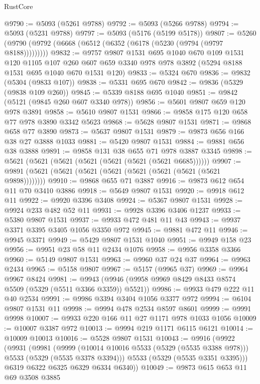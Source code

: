 \begin{lexlean}{RustCore}
\begin{coremodule}
@9790 := @5093 (@5261 @9788)
@9792 := @5093 (@5266 @9788)
@9794 := @5093 (@5231 @9788)
@9797 := @5093 (@5176 (@5199 @5178))
@9807 := @5260 (@9790 (@9792 (@6668 (@6512 (@6352 (@6178 (@5230 (@9794 (@9797 @8188)))))))))
@9832 := @9757
    @9807
    @1531
    @695
    @1040
    @670
    @109
    @1531
    @120
    @1105
    @107
    @260
    @607
    @659
    @3340
    @978
    @978
    @3892
    (@5294 @8188 @1531 @695 @1040 @670 @1531 @120)
@9833 := @5324 @670
@9836 := @9832 (@5304 (@9833 @107))
@9838 := @5331 @695 @670
@9842 := @9836 (@5329 (@9838 @109 @260))
@9845 := @5339 @8188 @695 @1040
@9851 := @9842 (@5121 (@9845 @260 @607 @3340 @978))
@9856 := @5601 @9807 @659 @120 @978 @3891
@9858 := @5610 @9807 @1531
@9866 := @9858 @175 @120 @658 @77 @978 @3890 @3342 @5623
@9868 := @5628 @9807 @1531
@9871 := @9868 @658 @77 @3890
@9873 := @5637 @9807 @1531
@9879 := @9873 @656 @166 @38 @27 @3888 @1033
@9881 := @5420 @9807 @1531
@9884 := @9881 @656 @38 @3888
@9891 := @9858 @131 @38 @655 @71 @978 @3887 @3345
@9898 := @5621 (@5621 (@5621 (@5621 (@5621 (@5621 (@5621 @6685))))))
@9907 := @9891 (@5621 (@5621 (@5621 (@5621 (@5621 (@5621 (@5621 (@5621 @9898))))))))
@9910 := @9868 @655 @71 @3887
@9916 := @9873 @612 @654 @11 @70 @3410 @3886
@9918 := @5649 @9807 @1531
@9920 := @9918 @612 @11
@9922 := @9920 @3396 @3408
@9924 := @5367 @9807 @1531
@9928 := @9924 @233 @482 @52 @11
@9931 := @9928 @3396 @3406 @1237
@9933 := @5380 @9807 @1531
@9937 := @9933 @472 @481 @11 @43
@9943 := @9937 @3371 @3395 @3405 @1056 @3350 @972
@9945 := @9881 @472 @11
@9946 := @9945 @3371
@9949 := @5429 @9807 @1531 @1040
@9951 := @9949 @158 @23
@9956 := @9951 @23 @58 @11 @2434 @1076
@9958 := @9956 @3358 @3366
@9960 := @5149 @9807 @1531
@9963 := @9960 @37 @24 @37
@9964 := @9963 @2434
@9965 := @5158 @9807
@9967 := @5157 (@9965 @37)
@9969 := @9964 @9967 @8424
@9981 := @9943 (@9946 (@9958 @9969 @8429 @8433 @8574 @5509 (@5329 (@5511 @3366 @3359)) @5521))
@9986 := @9933 @479 @222 @11 @40 @2534
@9991 := @9986 @3394 @3404 @1056 @3377 @972
@9994 := @6104 @9807 @1531 @11
@9998 := @9994 @478 @2534 @8597 @8601
@9999 := @9991 @9998
@10007 := @9933 @220 @166 @11 @27 @1171 @978 @1033 @1056
@10009 := @10007 @3387 @972
@10013 := @9994 @219 @1171 @6115 @6121
@10014 := @10009 @10013
@10016 := @5528 @9807 @1531
@10043 := @9916
    (@9922
      (@9931
        (@9981
          (@9999 (@10014 @10016 @5533 (@5329 (@5535 @3388 @978))) @5533 (@5329 (@5535 @3378 @3394)))
          @5533
          (@5329 (@5535 @3351 @3395)))
        @6319
        @6322
        @6325
        @6329
        @6334
        @6340))
@10049 := @9873 @615 @653 @11 @69 @3508 @3885

\end{coremodule}
\end{lexlean}
